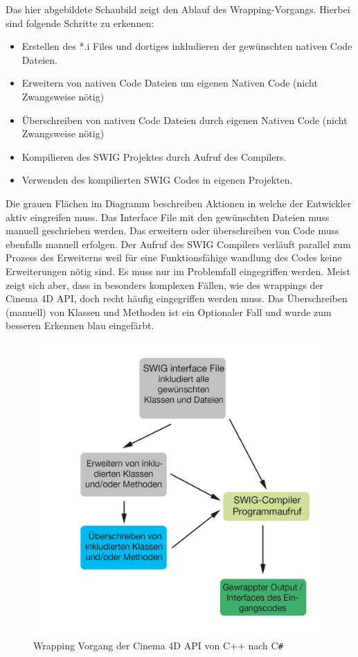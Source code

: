 \documentclass[pagesize, paper=a4, fontsize=12pt, titlepage=true, headings=small, headnosepline, abstractoff, liststotoc, nochapterprefix, plainheadsepline, twoside]{scrreprt}
\newcommand{\CS}{C\texttt{\#}}
\begin{document}
Das hier abgebildete Schaubild zeigt den Ablauf des Wrapping-Vorgangs. Hierbei sind folgende Schritte zu erkennen:
\begin{itemize}
\item Erstellen des *.i Files und dortiges inkludieren der gewünschten nativen Code Dateien.
\item Erweitern von nativen Code Dateien um eigenen Nativen Code (nicht Zwangsweise nötig)
\item Überschreiben von nativen Code Dateien durch eigenen Nativen Code (nicht Zwangsweise nötig)
\item Kompilieren des SWIG Projektes durch Aufruf des Compilers.
\item Verwenden des kompilierten SWIG Codes in eigenen Projekten.
\end{itemize}

Die grauen Flächen im Diagramm beschreiben Aktionen in welche der Entwickler aktiv eingreifen muss. Das Interface File mit den gewünschten Dateien muss manuell geschrieben werden. Das erweitern oder überschreiben von Code muss ebenfalls manuell erfolgen. Der Aufruf des SWIG Compilers verläuft parallel zum Prozess des Erweiterns weil für eine Funktionsfähige wandlung des Codes keine Erweiterungen nötig sind. Es muss nur im Problemfall eingegriffen werden. Meist zeigt sich aber, dass in besonders komplexen Fällen, wie des wrappings der Cinema 4D API, doch recht häufig eingegriffen werden muss. Das Überschreiben (manuell) von Klassen und Methoden ist ein Optionaler Fall und wurde zum besseren Erkennen blau eingefärbt.
\begin{figure}[ht]
	\centering
	\includegraphics[width=\linewidth]{Bilder/swig_wrapping_csharp.jpg}
	\caption{Wrapping Vorgang der Cinema 4D API von C++ nach \CS}
	\label{SWIG wrapping Vorgang}
\end{figure}
\end{document}
